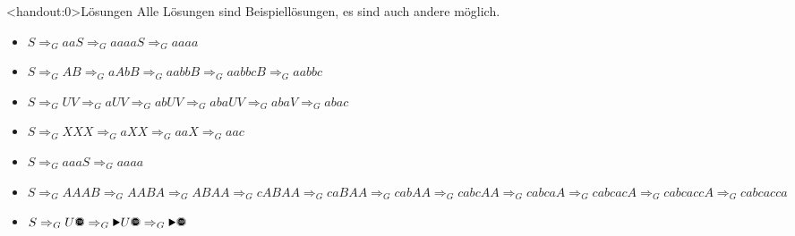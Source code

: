 {
\begin{frame}<handout:0>{Lösungen}
    Alle Lösungen sind Beispiellösungen, es sind auch andere möglich.
    \begin{itemize}[<+- | alert@+>]
        \item $S\Rightarrow_G aaS \Rightarrow_G aaaaS \Rightarrow_G aaaa$
        \item $S\Rightarrow_G AB \Rightarrow_G aAbB \Rightarrow_G aabbB \Rightarrow_G aabbcB \Rightarrow_G aabbc$
        \item $S\Rightarrow_G UV \Rightarrow_G aUV \Rightarrow_G abUV \Rightarrow_G abaUV \Rightarrow_G abaV \Rightarrow_G abac$
        \item $S\Rightarrow_G XXX \Rightarrow_G aXX \Rightarrow_G aaX \Rightarrow_G aac$
        \item $S\Rightarrow_G aaaS \Rightarrow_G aaaa$
        \item $S\Rightarrow_G AAAB \Rightarrow_G AABA \Rightarrow_G ABAA \Rightarrow_G cABAA \Rightarrow_G caBAA \Rightarrow_G cabAA \Rightarrow_G cabcAA \Rightarrow_G cabcaA\Rightarrow_G cabcacA \Rightarrow_G cabcaccA \Rightarrow_G cabcacca$
        \item $S\Rightarrow_G U\text{\Stopsign} \Rightarrow_G \text{\Forward}U\text{\Stopsign} \Rightarrow_G \text{\Forward}\text{\Stopsign}$
    \end{itemize}
\end{frame}
}
